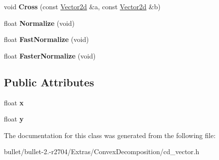 \begin{DoxyCompactItemize}
\item 
\hypertarget{class_convex_decomposition_1_1_vector2d_a4564a94c6588c2b7c03d99203b756d3b}{void {\bfseries Cross} (const \hyperlink{class_convex_decomposition_1_1_vector2d}{Vector2d} \&a, const \hyperlink{class_convex_decomposition_1_1_vector2d}{Vector2d} \&b)}\label{class_convex_decomposition_1_1_vector2d_a4564a94c6588c2b7c03d99203b756d3b}

\item 
\hypertarget{class_convex_decomposition_1_1_vector2d_a9221340f53a1e3692445ba818865a2b5}{float {\bfseries Normalize} (void)}\label{class_convex_decomposition_1_1_vector2d_a9221340f53a1e3692445ba818865a2b5}

\item 
\hypertarget{class_convex_decomposition_1_1_vector2d_a6a189ac42ef637a2f268ae83768b0ae4}{float {\bfseries Fast\+Normalize} (void)}\label{class_convex_decomposition_1_1_vector2d_a6a189ac42ef637a2f268ae83768b0ae4}

\item 
\hypertarget{class_convex_decomposition_1_1_vector2d_add76e8d551cdbd3fdecd6ad471d8034b}{float {\bfseries Faster\+Normalize} (void)}\label{class_convex_decomposition_1_1_vector2d_add76e8d551cdbd3fdecd6ad471d8034b}

\end{DoxyCompactItemize}
\subsection*{Public Attributes}
\begin{DoxyCompactItemize}
\item 
\hypertarget{class_convex_decomposition_1_1_vector2d_aa9afc3c3890375c4f33f324ce9f77aa4}{float {\bfseries x}}\label{class_convex_decomposition_1_1_vector2d_aa9afc3c3890375c4f33f324ce9f77aa4}

\item 
\hypertarget{class_convex_decomposition_1_1_vector2d_a796c23e55f65720b3318590a7abde1a1}{float {\bfseries y}}\label{class_convex_decomposition_1_1_vector2d_a796c23e55f65720b3318590a7abde1a1}

\end{DoxyCompactItemize}


The documentation for this class was generated from the following file\+:\begin{DoxyCompactItemize}
\item 
bullet/bullet-\/2.-\/r2704/\+Extras/\+Convex\+Decomposition/cd\+\_\+vector.\+h\end{DoxyCompactItemize}
